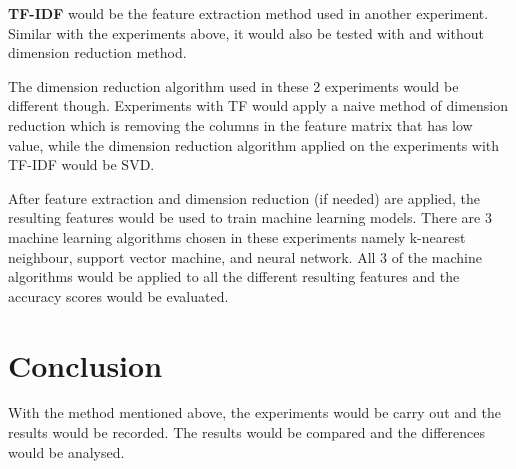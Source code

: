 \textbf{TF-IDF} would be the feature extraction method used in another experiment. Similar with the experiments above, it would also be tested with and without dimension reduction method.

The dimension reduction algorithm used in these 2 experiments would be different though. Experiments with TF would apply a naive method of dimension reduction which is removing the columns in the feature matrix that has low value, while the dimension reduction algorithm applied on the experiments with TF-IDF would be SVD.

After feature extraction and dimension reduction (if needed) are applied, the resulting features would be used to train machine learning models. There are 3 machine learning algorithms chosen in these experiments namely k-nearest neighbour, support vector machine, and neural network. All 3 of the machine algorithms would be applied to all the different resulting features and the accuracy scores would be evaluated.


\section{Conclusion}
With the method mentioned above, the experiments would be carry out and the results would be recorded. The results would be compared and the differences would be analysed.